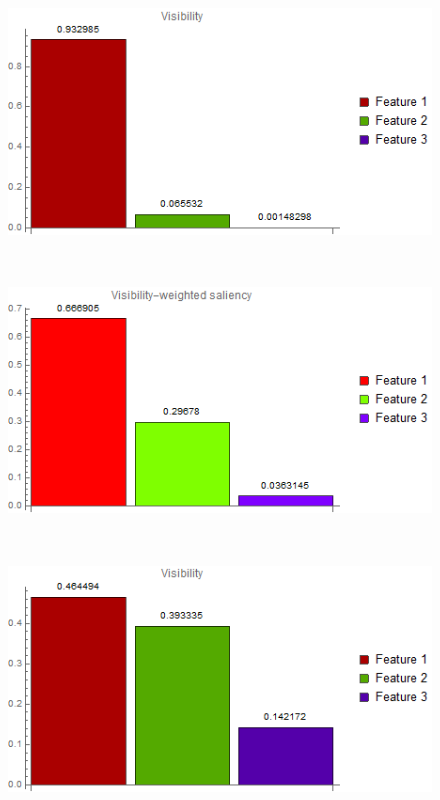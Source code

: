 \begin{figure}
	\begin{minipage}{.24\textwidth}
		\includegraphics[width=1\linewidth]{images/CT-Knee_naive_visibility_chart}
		\subcaption{}
	\end{minipage}~
	\begin{minipage}{.24\textwidth}
		\includegraphics[width=1\linewidth]{images/CT-Knee_naive_visibility_saliency_weighted_chart}
		\subcaption{}
	\end{minipage}~
	\begin{minipage}{.24\textwidth}
		\includegraphics[width=1\linewidth]{images/CT-Knee_naive_optimized_linesearch_visibility_chart}

\end{minipage}
\end{figure}
